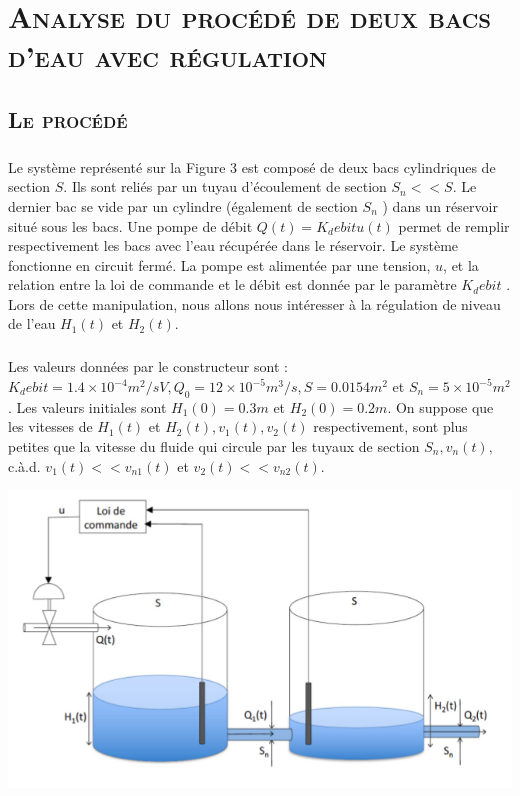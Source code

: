 \chapter{\textsc{Analyse du procédé de deux bacs d'eau avec régulation}}
\section{\textsc{Le procédé}}
	
	\paragraph{} Le système représenté sur la Figure 3 est composé de deux bacs cylindriques de section $S$. Ils sont reliés par un tuyau d’écoulement de section $S_n << S$. Le dernier bac se vide par un cylindre (également de section $S_n$ )
dans un réservoir situé sous les bacs. Une pompe de débit $Q(t) = K_debit u(t)$ permet de remplir respectivement
les bacs avec l’eau récupérée dans le réservoir. Le système fonctionne en circuit fermé. La pompe est alimentée
par une tension, $u$, et la relation entre la loi de commande et le débit est donnée par le paramètre $K_debit$ . Lors
de cette manipulation, nous allons nous intéresser à la régulation de niveau de l’eau $H_1 (t)$ et $H_2 (t)$.

\paragraph{} Les valeurs données par le constructeur sont : $K_debit = 1.4 \times 10^{-4} m^2/sV , Q_0 = 12 \times 10^{-5} m^3/s, S = 0.0154m^2$ et $S_n = 5 \times 10^{-5} m^2$. Les valeurs initiales sont $H_1(0) = 0.3m$ et $H_2(0) = 0.2m$.
On suppose que les vitesses de $H_1 (t)$ et $H_2 (t), v_1 (t), v_2 (t)$ respectivement, sont plus petites que la vitesse du fluide qui circule par les tuyaux de section $S_n , v_n (t),$ c.à.d. $v_1 (t) << v_{n1} (t)$ et $v_2 (t) << v_{n2} (t)$.

	\begin{center}
	\includegraphics[scale=0.5]{3bac.png}
	\label{fig3} 
	\end{center} 

